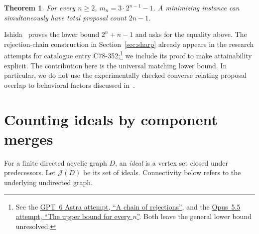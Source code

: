 \documentclass[11pt]{article}
\newtheorem{theorem}{Theorem}
\newcommand{\Id}{\mathcal J}
\begin{document}
\begin{theorem}\label{thm:main}
For every $n\ge2$, $m_n=3\cdot2^{n-1}-1$. A minimizing instance can
simultaneously have total proposal count $2n-1$.
\end{theorem}

Ishida~\cite[Proposition~21.4 and Section~7(A)]{ishida} proves the lower
bound $2^n+n-1$ and asks for the equality above. The rejection-chain
construction in Section~\ref{sec:sharp} already appears in the
research attempts for catalogue entry C78-352;\footnote{See the
\href{https://github.com/mehmetmars7/Erdosproblems-llm-hunter/blob/00ced55ba1223fb48603e1f15028d753997ee515/attacks/open_problems/economics/gpt_6_astra_ultra/C78-352.tex}{GPT~6 Astra attempt, ``A chain of rejections''}, and the
\href{https://github.com/mehmetmars7/Erdosproblems-llm-hunter/blob/00ced55ba1223fb48603e1f15028d753997ee515/attacks/open_problems/economics/opus_5.5_high/C78-352.tex}{Opus~5.5 attempt, ``The upper bound for every $n$''}.
Both leave the general lower bound unresolved.}
we include its proof to
make attainability explicit. The contribution here is the universal
matching lower bound. In particular, we do not use the experimentally
checked converse relating proposal overlap to behavioral factors
discussed in~\cite[Sections~2 and~4]{ishida}.

\section{Counting ideals by component merges}

For a finite directed acyclic graph $D$, an \emph{ideal} is a vertex set
closed under predecessors. Let $\Id(D)$ be its set of ideals. Connectivity
below refers to the underlying undirected graph.
\end{document}
